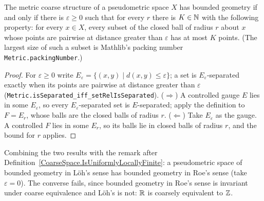 \begin{theorem}[cf.\ Roe Ex.~3.13]
  \label{CoarseSpace.hasBoundedGeometry_iff_packingNumber_le}
  The metric coarse structure of a pseudometric space $X$ has bounded geometry if and only if
  there is $\varepsilon \ge 0$ such that for every $r$ there is $K \in \mathbb{N}$ with the following
  property: for every $x \in X$, every subset of the closed ball of radius $r$ about $x$ whose
  points are pairwise at distance greater than $\varepsilon$ has at most $K$ points. (The
  largest size of such a subset is Mathlib's packing number \texttt{Metric.packingNumber}.)
\end{theorem}
\begin{proof}
  For $\varepsilon \ge 0$ write $E_\varepsilon = \{(x, y) \mid d(x, y) \le \varepsilon\}$; a set
  is $E_\varepsilon$-separated exactly when its points are pairwise at distance greater than
  $\varepsilon$ (\texttt{Metric.isSeparated\_iff\_setRelIsSeparated}).
  ($\Rightarrow$) A controlled gauge $E$ lies in some $E_\varepsilon$, so every
  $E_\varepsilon$-separated set is $E$-separated; apply the definition to $F = E_r$, whose
  balls are the closed balls of radius $r$.
  ($\Leftarrow$) Take $E_\varepsilon$ as the gauge. A controlled $F$ lies in some $E_r$, so its
  balls lie in closed balls of radius $r$, and the bound for $r$ applies.
\end{proof}

Combining the two results with the remark after
Definition~\ref{CoarseSpace.IsUniformlyLocallyFinite}: a pseudometric space of bounded geometry
in L\"oh's sense has bounded geometry in Roe's sense (take $\varepsilon = 0$). The converse
fails, since bounded geometry in Roe's sense is invariant under coarse equivalence and L\"oh's
is not: $\mathbb{R}$ is coarsely equivalent to $\mathbb{Z}$.
